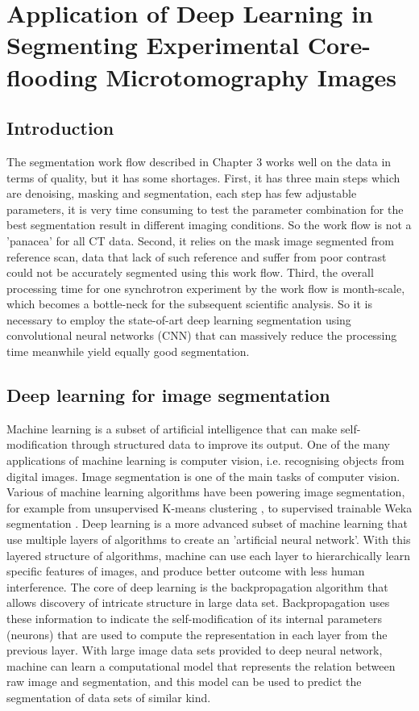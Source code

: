 \chapter{Application of Deep Learning in Segmenting Experimental Core-flooding Microtomography Images}
\section{Introduction}
The segmentation work flow described in Chapter 3 works well on the data in terms of quality, but it has some shortages. First, it has three main steps which are denoising, masking and segmentation, each step has few adjustable parameters, it is very time consuming to test the parameter combination for the best segmentation result in different imaging conditions. So the work flow is not a 'panacea' for all CT data. Second, it relies on the mask image segmented from reference scan, data that lack of such reference and suffer from poor contrast could not be accurately segmented using this work flow. Third, the overall processing time for one synchrotron experiment by the work flow is month-scale, which becomes a bottle-neck for the subsequent scientific analysis. So it is necessary to employ the state-of-art deep learning segmentation using convolutional neural networks (CNN) that can massively reduce the processing time meanwhile yield equally good segmentation.

\section{Deep learning for image segmentation}
Machine learning is a subset of artificial intelligence that can make self-modification through structured data to improve its output. One of the many applications of machine learning is computer vision, i.e. recognising objects from digital images. Image segmentation is one of the main tasks of computer vision. Various of machine learning algorithms have been powering image segmentation, for example from unsupervised K-means clustering \citep{lloyd1982least}, to supervised trainable Weka segmentation \citep{arganda2017trainable}. Deep learning is a more advanced subset of machine learning that use multiple layers of algorithms to create an 'artificial neural network'. With this layered structure of algorithms, machine can use each layer to hierarchically learn specific features of images, and produce better outcome with less human interference. The core of deep learning is the backpropagation algorithm \citet{lecun1989backpropagation} that allows discovery of intricate structure in large data set. Backpropagation uses these information to indicate the self-modification of its internal parameters (neurons) that are used to compute the representation in each layer from the previous layer. With large image data sets provided to deep neural network, machine can learn a computational model that represents the relation between raw image and segmentation, and this model can be used to predict the segmentation of data sets of similar kind.


